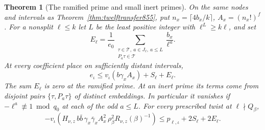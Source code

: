 \documentclass[a4paper,11pt]{article}
\newtheorem{theorem}[proposition]{Theorem}
\theoremstyle{definition}
\theoremstyle{remark}
\numberwithin{equation}{section}
\begin{document}
\begin{theorem}[The ramified prime and small inert primes]
\leavevmode\label{thm:shortpairs859}
On the same nodes and intervals as Theorem~\ref{thm:twelftransfer855},
put \(n_x=\lceil4b_x/k\rceil\), \(A_x=(n_x!)^f\).
For a nonsplit \(\ell\le k\) let \(L\) be the least positive
integer with \(\ell^L\ge k\ell\), and set
\[
 E_\ell=\frac1{e_0}\!
   \sum_{\substack{\tau\in\mathcal T,\ a\in J_\ell,\ a\le L\\
                           P_a\tau\in\mathcal T}}\frac{b_x}{\ell^a}.
\]
At every coefficient place on sufficiently distant intervals,
\[
             e_\iota\le v_\iota(b\gamma_x A_x)+S_\ell+E_\ell .
\]
The sum \(E_\ell\) is zero at the ramified prime. At an inert
prime its terms come from disjoint pairs
\(\{\tau,P_a\tau\}\) of distinct embeddings. In particular it
vanishes if \(-\ell^a\not\equiv1\bmod q_0\) at each of the
odd \(a\le L\).
For every prescribed twist at \(\ell\nmid Q_\beta\),
\begin{equation}
 -v_\iota\!\left(H_{\nu,z}\,b\bar b\,
              \gamma_x\bar\gamma_x A_x^2\,
                   \rho_\beta^2 R_{\nu,z}(\beta)^{-1}\right)
       \le p_{\ell,\iota}+2S_\ell+2E_\ell .
 \label{eq:shortpairs859}
\end{equation}
\end{theorem}
\end{document}
